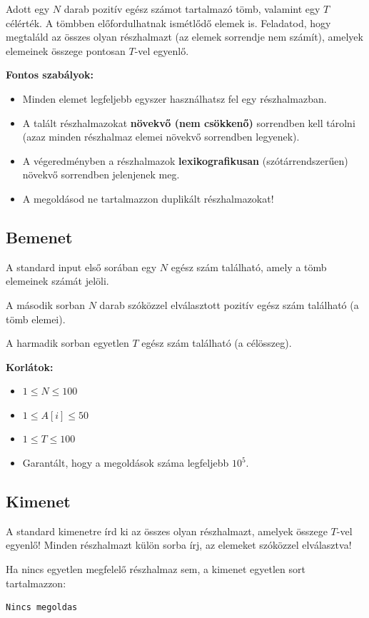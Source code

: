 \documentclass[12pt,a4paper]{article}
\begin{document}
Adott egy $N$ darab pozitív egész számot tartalmazó tömb, valamint egy $T$ célérték. A tömbben előfordulhatnak ismétlődő elemek is. Feladatod, hogy megtaláld az összes olyan részhalmazt (az elemek sorrendje nem számít), amelyek elemeinek összege pontosan $T$-vel egyenlő.

\textbf{Fontos szabályok:}
\begin{itemize}
    \item Minden elemet legfeljebb egyszer használhatsz fel egy részhalmazban.
    \item A talált részhalmazokat \textbf{növekvő (nem csökkenő)} sorrendben kell tárolni (azaz minden részhalmaz elemei növekvő sorrendben legyenek).
    \item A végeredményben a részhalmazok \textbf{lexikografikusan} (szótárrendszerűen) növekvő sorrendben jelenjenek meg.
    \item A megoldásod ne tartalmazzon duplikált részhalmazokat!
\end{itemize}

\subsection*{Bemenet}

A standard input első sorában egy $N$ egész szám található, amely a tömb elemeinek számát jelöli.

A második sorban $N$ darab szóközzel elválasztott pozitív egész szám található (a tömb elemei).

A harmadik sorban egyetlen $T$ egész szám található (a célösszeg).

\textbf{Korlátok:}
\begin{itemize}
    \item $1 \le N \le 100$
    \item $1 \le A[i] \le 50$
    \item $1 \le T \le 100$
    \item Garantált, hogy a megoldások száma legfeljebb $10^5$.
\end{itemize}

\subsection*{Kimenet}

A standard kimenetre írd ki az összes olyan részhalmazt, amelyek összege $T$-vel egyenlő! Minden részhalmazt külön sorba írj, az elemeket szóközzel elválasztva!

Ha nincs egyetlen megfelelő részhalmaz sem, a kimenet egyetlen sort tartalmazzon:
\begin{verbatim}
Nincs megoldas
\end{verbatim}
\end{document}

